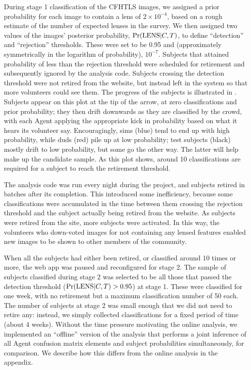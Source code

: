 \documentclass[useAMS,usenatbib,a4paper]{mn2e}
\begin{document}
During stage 1 classification of the CFHTLS images, we assigned a prior
probability for each image to contain a lens of $2\times10^{-4}$, based on a
rough estimate of the number of expected lenses in the survey. We then
assigned two values of the images' posterior probability, ${\rm Pr}({\rm LENS}|C,T)$, to
define ``detection'' and ``rejection'' thresholds. These were set to be 0.95
and (approximately symmetrically in the logarithm of probability), $10^{-7}$.
Subjects that attained probability of less than the rejection threshold were
scheduled for retirement and subsequently ignored by the analysis code.
Subjects crossing the detection threshold were not retired from the website,
but instead left in the system so that more volunteers could see them. The
progress of the subjects is illustrated in .
Subjects appear on this plot at the tip of the arrow, at zero classifications
and prior probability; they then drift downwards as they are classified by the
crowd, with each Agent applying the appropriate kick in probability based on
what it hears its volunteer say. Encouragingly, sims (blue) tend to end up
with high probability, while duds (red) pile up at low probability; test
subjects (black) mostly drift to low probability, but some go the other way.
The latter will help make up the candidate sample. As this plot shows, around
10 classifications are required for a subject to reach the retirement
threshold.

The analysis code was run every night during the project, and subjects retired
in batches after its completion. This introduced some inefficiency, because
some classifications were accumulated in the time between them crossing the
rejection threshold and the subject actually being retired from the website.
As subjects were retired from the site, more subjects were activated. In this
way, the volunteers who down-voted images for not containing any lensed
features enabled new images to be shown to other members of the community.

When all the subjects had either been retired, or classified around 10 times
or more, the web app was paused and reconfigured for stage 2. The sample of
subjects classified during stage 2 was selected to be all those that passed
the detection threshold (${\rm Pr}({\rm LENS}|C,T) > 0.95$) at stage 1. These were
classified for one week, with no retirement but a maximum classification
number of 50 each. The number of subjects at stage 2 was small enough that we
did not need to retire any: instead, we simply collected classifications for a
fixed period of time (about 4 weeks). Without the time pressure motivating the
online analysis, we implemented an ``offline'' version of the analysis that
performs a joint inference of all Agent confusion matrix elements and subject
probabilities simultaneously, for comparison. We describe how this differs
from the online analysis in the appendix.
\end{document}
